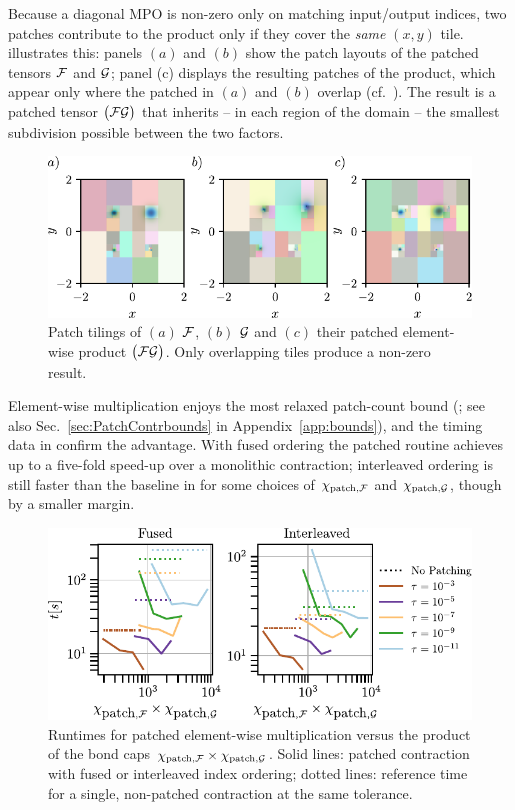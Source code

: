 Because a diagonal MPO is non-zero only on matching input/output indices, two patches contribute to the product only if they cover the \emph{same} \((x,y)\) tile.  
 illustrates this: panels $(a)$ and $(b)$ show the patch layouts of the patched tensors \(\mathcal{F}\) and
\(\mathcal{G}\); panel (c) displays the resulting patches of the product, which appear only where the patched in $(a)$ and $(b)$ overlap (cf.\
). The result is a patched tensor \(\bigl(\mathcal{F}\mathcal{G}\bigr)\) that inherits -- in each region of the domain -- the smallest subdivision possible between the two factors.
\begin{figure}[htbp]
    \centering
    \includegraphics{figures/ElemmulResults.pdf}
    \caption{Patch tilings of $(a)$ \(\mathcal{F}\), $(b)$ \(\mathcal{G}\) and $(c)$ their patched element-wise product \(\bigl(\mathcal{F}\mathcal{G}\bigr)\). Only overlapping tiles produce a non-zero result.}
    \label{fig:patchingPatternsElemMul}
\end{figure}

Element-wise multiplication enjoys the most relaxed patch-count bound (; see also
Sec.~\ref{sec:PatchContrbounds} in Appendix~\ref{app:bounds}), and the timing
data in \prettyref{fig:elemMulResults} confirm the advantage. With fused ordering the patched routine achieves up to a five-fold speed-up
over a monolithic contraction; interleaved ordering is still faster than the baseline in for some choices of $\chi_{\text{patch},\mathcal{F}}$ and $\chi_{\text{patch},\mathcal{G}}$, though by a smaller margin.



\begin{figure}[ht!]
    \centering
    \includegraphics{figures/elemmulTimeResults.pdf}
    \caption{Runtimes for patched element-wise multiplication versus the product of the bond caps \(\chi_{\text{patch},\mathcal{F}}\times\chi_{\text{patch},\mathcal{G}}\). Solid lines: patched contraction with fused or interleaved index ordering; dotted lines: reference time for a single, non-patched contraction at the same tolerance. }
    \label{fig:elemMulResults}
\end{figure}

